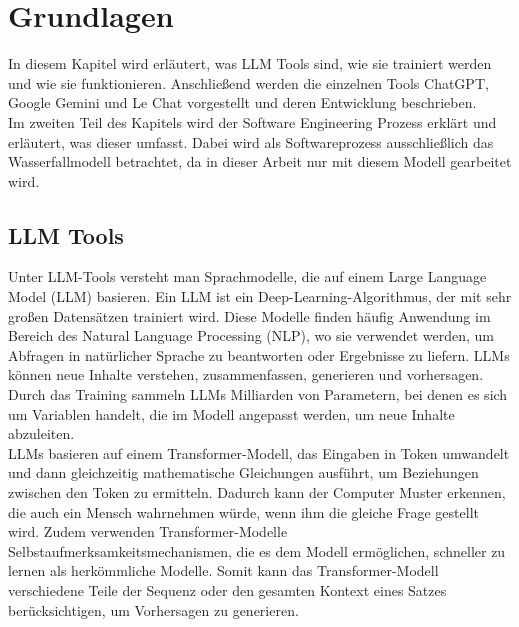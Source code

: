
\chapter{Grundlagen} 

In diesem Kapitel wird erläutert, was LLM Tools sind, wie sie trainiert werden und wie sie funktionieren. Anschließend 
werden die einzelnen Tools ChatGPT, Google Gemini und Le Chat vorgestellt und deren Entwicklung beschrieben.\\

Im zweiten Teil des Kapitels wird der Software Engineering Prozess erklärt und erläutert, was dieser umfasst. 
Dabei wird als Softwareprozess ausschließlich das Wasserfallmodell betrachtet, da in dieser Arbeit nur mit diesem 
Modell gearbeitet wird.

\section{LLM Tools}  \label{LLM Tools}

Unter LLM-Tools versteht man Sprachmodelle, die auf einem Large Language Model (LLM) basieren. Ein LLM ist ein 
Deep-Learning-Algorithmus, der mit sehr großen Datensätzen trainiert wird. Diese Modelle finden häufig Anwendung im 
Bereich des Natural Language Processing (NLP), wo sie verwendet werden, um Abfragen in natürlicher Sprache zu beantworten 
oder Ergebnisse zu liefern. LLMs können neue Inhalte verstehen, zusammenfassen, generieren und vorhersagen. Durch das Training 
sammeln LLMs Milliarden von Parametern, bei denen es sich um Variablen handelt, die im Modell angepasst werden, um neue 
Inhalte abzuleiten.\\
LLMs basieren auf einem Transformer-Modell, das Eingaben in Token umwandelt und dann gleichzeitig mathematische 
Gleichungen ausführt, um Beziehungen zwischen den Token zu ermitteln. Dadurch kann der Computer Muster erkennen, 
die auch ein Mensch wahrnehmen würde, wenn ihm die gleiche Frage gestellt wird. Zudem verwenden Transformer-Modelle 
Selbstaufmerksamkeitsmechanismen, die es dem Modell ermöglichen, schneller zu lernen als herkömmliche Modelle. 
Somit kann das Transformer-Modell verschiedene Teile der Sequenz oder den gesamten Kontext eines Satzes berücksichtigen, 
um Vorhersagen zu generieren.

